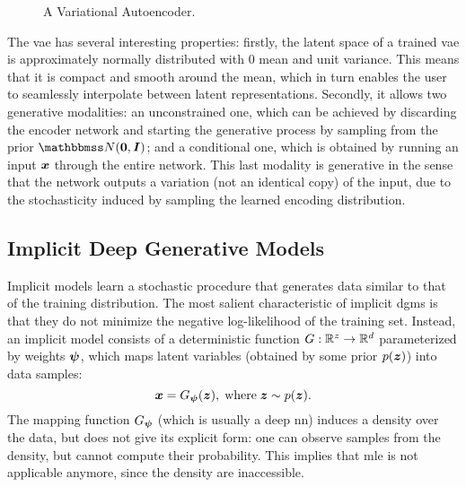 \begin{figure*}[h!]
    \centering
    \resizebox{.75\textwidth}{!}{}
    \caption{A Variational Autoencoder.}
    \label{fig:vae}
\end{figure*}
The \gls{vae} has several interesting properties: firstly, the latent space of a trained \gls{vae} is approximately normally distributed with 0 mean and unit variance. This means that it is compact and smooth around the mean, which in turn enables the user to seamlessly interpolate between latent representations. Secondly, it allows two generative modalities: an unconstrained one, which can be achieved by discarding the encoder network and starting the generative process by sampling from the prior $\Normal{\ZeroVector}{\Matrix{I}}$; and a conditional one, which is obtained by running an input $\Vector{x}$ through the entire network. This last modality is generative in the sense that the network outputs a variation (not an identical copy) of the input, due to the stochasticity induced by sampling the learned encoding distribution.

\subsection{Implicit Deep Generative Models}
Implicit models \citep{mohamed2016implicitgan} learn a stochastic procedure that generates data similar to that of the training distribution. The most salient characteristic of implicit \glspl{dgm} is that they do not minimize the negative log-likelihood of the training set. Instead, an implicit model consists of a deterministic  function $G: \mathbb{R}^z \rightarrow \mathbb{R}^d$ parameterized by weights $\boldsymbol{\psi}$, which maps latent variables (obtained by some prior $p(\Vector{z})$) into data samples:
$$\Vector{x} = \Generator(\Vector{z}),\; \mathrm{where}\; \Vector{z} \sim p(\Vector{z}).$$
The mapping function $G_{\boldsymbol{\psi}}$ (which is usually a deep \gls{nn}) induces a density over the data, but does not give its explicit form: one can observe samples from the density, but cannot compute their probability. This implies that \gls{mle} is not applicable anymore, since the density are inaccessible.

